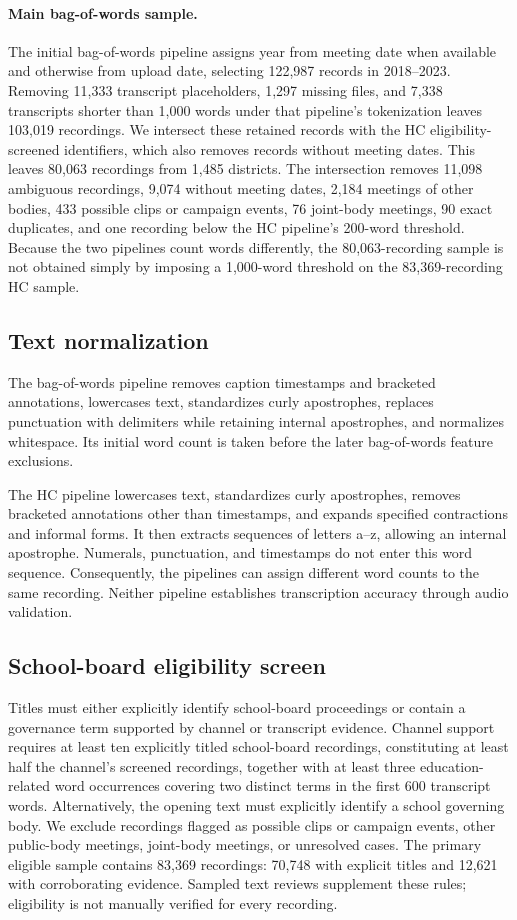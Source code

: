 \paragraph{Main bag-of-words sample.}
The initial bag-of-words pipeline assigns year from meeting
date when available and otherwise from upload date, selecting
122,987 records in 2018--2023. Removing 11,333 transcript
placeholders, 1,297 missing files, and 7,338 transcripts shorter
than 1,000 words under that pipeline's tokenization leaves
103,019 recordings. We intersect these retained records with
the HC eligibility-screened identifiers, which also removes
records without meeting dates. This leaves 80,063 recordings
from 1,485 districts. The intersection removes 11,098 ambiguous
recordings, 9,074 without meeting dates, 2,184 meetings of other
bodies, 433 possible clips or campaign events, 76 joint-body
meetings, 90 exact duplicates, and one recording below the
HC pipeline's 200-word threshold. Because the two pipelines
count words differently, the 80,063-recording sample is not
obtained simply by imposing a 1,000-word threshold on the
83,369-recording HC sample.

\subsection{Text normalization}

The bag-of-words pipeline removes caption timestamps and
bracketed annotations, lowercases text, standardizes curly
apostrophes, replaces punctuation with delimiters while
retaining internal apostrophes, and normalizes whitespace.
Its initial word count is taken before the later
bag-of-words feature exclusions.

The HC pipeline lowercases text, standardizes curly
apostrophes, removes bracketed annotations other than
timestamps, and expands specified contractions and informal
forms. It then extracts sequences of letters a--z, allowing
an internal apostrophe. Numerals, punctuation, and timestamps
do not enter this word sequence. Consequently, the pipelines
can assign different word counts to the same recording.
Neither pipeline establishes transcription accuracy through
audio validation.

\subsection{School-board eligibility screen}
Titles must either explicitly identify school-board proceedings or contain a
governance term supported by channel or transcript evidence. Channel support
requires at least ten explicitly titled school-board recordings, constituting at
least half the channel's screened recordings, together with at least three
education-related word occurrences covering two distinct terms in the first 600
transcript words. Alternatively, the opening text must explicitly identify a
school governing body. We exclude recordings flagged as possible clips or campaign
events, other public-body meetings, joint-body meetings, or unresolved cases. The
primary eligible sample contains 83,369 recordings: 70,748 with explicit titles and
12,621 with corroborating evidence. Sampled text reviews supplement these rules;
eligibility is not manually verified for every recording.

